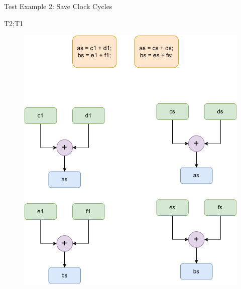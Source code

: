 \documentclass[notes, xcolor=dvipsnames]{beamer}
\begin{document}
    \begin{frame}{Test Example 2: Save Clock Cycles}

        T2;T1
        \begin{figure}
            \includegraphics[scale=0.4]{PartialSharedMerge.pdf}
        \end{figure}


    \end{frame}
\end{document}
